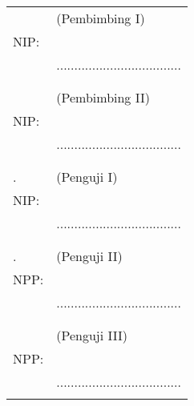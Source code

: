\noindent
\begin{tabularx}{\textwidth}{X l}
  \advisor{}               & (Pembimbing I)                      \\
  NIP: \advisornip{}       &                                     \\
                           & ................................... \\
                           &                                     \\
                           &                                     \\
  \coadvisor{}             & (Pembimbing II)                     \\
  NIP: \coadvisornip{}     &                                     \\
                           & ................................... \\
                           &                                     \\
                           &                                     \\
  \examinerone{}.          & (Penguji I)                         \\
  NIP: \examineronenip{}   &                                     \\
                           & ................................... \\
                           &                                     \\
                           &                                     \\
  \examinertwo{}.          & (Penguji II)                        \\
  NPP: \examinertwonip{}   &                                     \\
                           & ................................... \\
                           &                                     \\
                           &                                     \\
\ifbool{bpenguji3}{
  \examinerthree{}.        & (Penguji III)                       \\
  NPP: \examinerthreenip{} &                                     \\
                          & ................................... \\
}


\end{tabularx}
